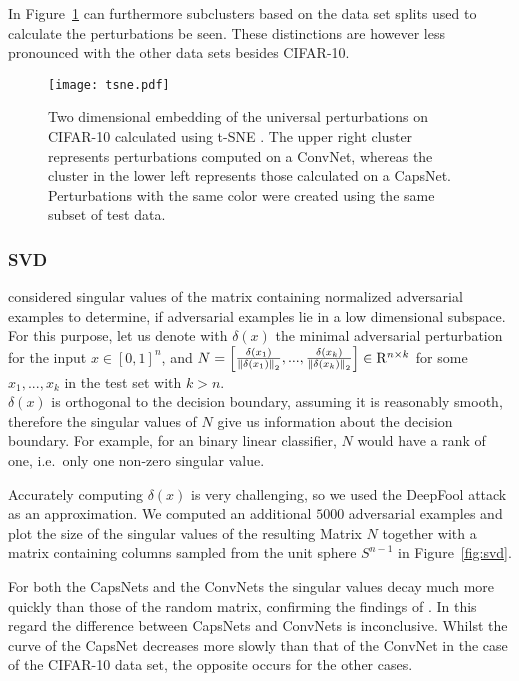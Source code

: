 In Figure~\ref{fig:tsne} can furthermore subclusters based on the data set splits used to calculate the perturbations be seen.
These distinctions are however less pronounced with the other data sets besides CIFAR-10.

\begin{figure}
	\texttt{[image: tsne.pdf]}
	\caption[t-SNE Plot of Universal Perturbations]{Two dimensional embedding of the universal perturbations on CIFAR-10 calculated using t-SNE \citep{tsne}. The upper right cluster represents perturbations computed on a ConvNet, whereas the cluster in the lower left represents those calculated on a CapsNet. Perturbations with the same color were created using the same subset of test data.}
	\label{fig:tsne}
\end{figure}


\subsubsection{SVD}
\citet{universal} considered singular values of the matrix containing normalized adversarial examples to determine, if adversarial examples lie in a low dimensional subspace. \\
For this purpose, let us denote with $\delta(x)$ the minimal adversarial perturbation for the input $x \in [0,1]^n$,
and $ N = \begin{bmatrix}
\frac{\delta(x_1)} {\left \lVert \delta(x_1) \right \rVert _{2}},  ...,  \frac{\delta(x_k)} {\left \lVert \delta(x_k) \right \rVert _{2}} 
\end{bmatrix}
\in \mathrm{R}^{n \times k}
$ for some $x_1, ..., x_k$ in the test set with $k > n$. \\
$\delta(x)$ is orthogonal to the decision boundary, assuming it is reasonably smooth, therefore the singular values of $N$ give us information about the decision boundary. For example, for an binary linear classifier, $N$ would have a rank of one, i.e.\ only one non-zero singular value.

Accurately computing $\delta(x)$ is very challenging, so we used the DeepFool attack as an approximation. We computed an additional $5000$ adversarial examples and plot the size of the singular values of the resulting Matrix $N$ together with a matrix containing columns sampled from the unit sphere $S^{n-1}$ in Figure~\ref{fig:svd}.

For both the CapsNets and the ConvNets the singular values decay much more quickly than those of the random matrix, confirming the findings of \citet{universal}.
In this regard the difference between CapsNets and ConvNets is inconclusive.
Whilst the curve of the CapsNet decreases more slowly than that of the ConvNet in the case of the CIFAR-10 data set, the opposite occurs for the other cases.


